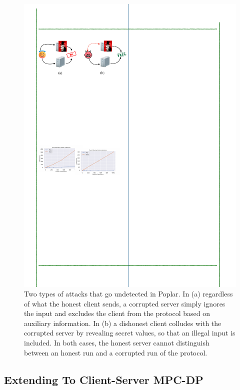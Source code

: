 \begin{figure}[t]
    \centering    
	\includegraphics[scale=0.9]{pngs/attack.pdf}
	\caption{Two types of attacks that go undetected in Poplar. In (a) regardless of what the honest client sends, a corrupted server simply ignores the input and excludes the client from the protocol based on auxiliary information. In (b) a dishonest client colludes with the corrupted server by revealing secret values, so that an illegal input is included. In both cases, the honest server cannot distinguish between an honest run and a corrupted run of the protocol.}
	\label{fig:attacks}
\end{figure}

\subsection{Extending To Client-Server MPC-DP}
\label{sec:client-server-mpc-dp}

